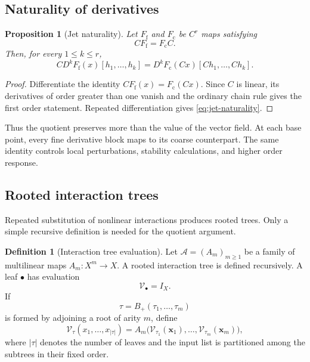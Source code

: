 \documentclass[11pt]{article}
\newtheorem{proposition}[theorem]{Proposition}
\theoremstyle{definition}
\newtheorem{definition}[theorem]{Definition}
\theoremstyle{remark}
\newcommand{\cA}{\mathcal A}
\newcommand{\cV}{\mathcal V}
\newcommand{\fine}{\mathrm f}
\newcommand{\coarse}{\mathrm c}
\begin{document}
\subsection{Naturality of derivatives}

\begin{proposition}[Jet naturality]\label{prop:jet-naturality}
Let $F_{\fine}$ and $F_{\coarse}$ be $C^r$ maps satisfying
\[
  CF_{\fine}=F_{\coarse}C.
\]
Then, for every $1\leq k\leq r$,
\begin{equation}\label{eq:jet-naturality}
  \boxed{
  C D^kF_{\fine}(x)[h_1,\ldots,h_k]
  =
  D^kF_{\coarse}(Cx)[Ch_1,\ldots,Ch_k].}
\end{equation}
\end{proposition}

\begin{proof}
Differentiate the identity $CF_{\fine}(x)=F_{\coarse}(Cx)$.  Since $C$ is linear, its derivatives of order greater than one vanish and the ordinary chain rule gives the first order statement.  Repeated differentiation gives \eqref{eq:jet-naturality}.
\end{proof}

Thus the quotient preserves more than the value of the vector field.  At each base point, every fine derivative block maps to its coarse counterpart.  The same identity controls local perturbations, stability calculations, and higher order response.

\subsection{Rooted interaction trees}
Repeated substitution of nonlinear interactions produces rooted trees.  Only a simple recursive definition is needed for the quotient argument.

\begin{definition}[Interaction tree evaluation]\label{def:tree-evaluation}
Let $\cA=(A_m)_{m\geq1}$ be a family of multilinear maps $A_m:X^m\to X$.  A rooted interaction tree is defined recursively.  A leaf $\bullet$ has evaluation
\[
  \cV_{\bullet}=I_X.
\]
If
\[
  \tau=B_+(\tau_1,\ldots,\tau_m)
\]
is formed by adjoining a root of arity $m$, define
\begin{equation}\label{eq:tree-evaluation}
  \cV_{\tau}(x_1,\ldots,x_{|\tau|})
  =
  A_m\bigl(
  \cV_{\tau_1}(\mathbf x_1),\ldots,
  \cV_{\tau_m}(\mathbf x_m)
  \bigr),
\end{equation}
where $|\tau|$ denotes the number of leaves and the input list is partitioned among the subtrees in their fixed order.
\end{definition}
\end{document}
